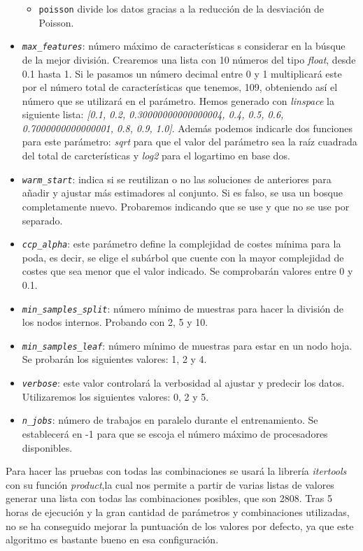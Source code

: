 \begin{itemize}
\begin{itemize}
            \item \texttt{poisson} divide los datos gracias a la reducción de la desviación de Poisson. 
        \end{itemize}
    \item \texttt{\textit{max\_features}}: número máximo de características s considerar en la búsque de la mejor división. Crearemos una lista con 10 números del tipo \textit{float}, desde 0.1 hasta 1. Si le pasamos un número decimal entre 0 y 1 multiplicará este por el número total de características que tenemos, 109, obteniendo así el número que se utilizará en el parámetro. Hemos generado con \textit{linspace} la siguiente lista: \textit{[0.1, 0.2, 0.30000000000000004, 0.4, 0.5, 0.6, 0.7000000000000001, 0.8, 0.9, 1.0]}. Además podemos indicarle dos funciones para este parámetro: \textit{sqrt} para que el valor del parámetro sea la raíz cuadrada del total de carcterísticas y \textit{log2} para el logartimo en base dos.
    \item \texttt{\textit{warm\_start}}: indica si se reutilizan o no las soluciones de anteriores para añadir y ajustar más estimadores al conjunto. Si es falso, se usa un bosque completamente nuevo. Probaremos indicando que se use y que no se use por separado.
    \item \texttt{\textit{ccp\_alpha}}: este parámetro define la complejidad de costes mínima para la poda, es decir, se elige el subárbol que cuente con la mayor complejidad de costes que sea menor que el valor indicado. Se comprobarán valores entre 0 y 0.1.
    \item\texttt{\textit{min\_samples\_split}}: número mínimo de muestras para hacer la división de los nodos internos. Probando con 2, 5 y 10.
    \item \texttt{\textit{min\_samples\_leaf}}: número mínimo de muestras para estar en un nodo hoja. Se probarán los siguientes valores: 1, 2 y 4.
    \item \texttt{\textit{verbose}}: este valor controlará la verbosidad al ajustar y predecir los datos. Utilizaremos los siguientes valores: 0, 2 y 5.
    \item \texttt{\textit{n\_jobs}}: número de trabajos en paralelo durante el entrenamiento. Se establecerá en -1 para que se escoja el número máximo de procesadores disponibles.
\end{itemize}
Para hacer las pruebas con todas las combinaciones se usará la librería \textit{itertools} con su función \textit{product},la cual nos permite a partir de varias listas de valores generar una lista con todas las combinaciones posibles, que son 2808.
Tras 5 horas de ejecución y la gran cantidad de parámetros y combinaciones utilizadas, no se ha conseguido mejorar la puntuación de los valores por defecto, ya que este algoritmo es bastante bueno en esa configuración.

